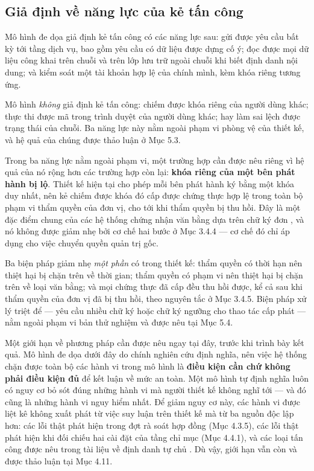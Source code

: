 \subsection{Giả định về năng lực của kẻ tấn công}

Mô hình đe dọa giả định kẻ tấn công có các năng lực sau: gửi được yêu cầu bất kỳ tới tầng dịch vụ, bao gồm yêu cầu có dữ liệu được dựng cố ý; đọc được mọi dữ liệu công khai trên chuỗi và trên lớp lưu trữ ngoài chuỗi khi biết định danh nội dung; và kiểm soát một tài khoản hợp lệ của chính mình, kèm khóa riêng tương ứng.

Mô hình \emph{không} giả định kẻ tấn công: chiếm được khóa riêng của người dùng khác; thực thi được mã trong trình duyệt của người dùng khác; hay làm sai lệch được trạng thái của chuỗi. Ba năng lực này nằm ngoài phạm vi phòng vệ của thiết kế, và hệ quả của chúng được thảo luận ở Mục 5.3.

Trong ba năng lực nằm ngoài phạm vi, một trường hợp cần được nêu riêng vì hệ quả của nó rộng hơn các trường hợp còn lại: \textbf{khóa riêng của một bên phát hành bị lộ}. Thiết kế hiện tại cho phép mỗi bên phát hành ký bằng một khóa duy nhất, nên kẻ chiếm được khóa đó cấp được chứng thực hợp lệ trong toàn bộ phạm vi thẩm quyền của đơn vị, cho tới khi thẩm quyền bị thu hồi. Đây là một đặc điểm chung của các hệ thống chứng nhận văn bằng dựa trên chữ ký đơn \cite{Saramago2021}, và nó không được giảm nhẹ bởi cơ chế hai bước ở Mục 3.4.4 --- cơ chế đó chỉ áp dụng cho việc chuyển quyền quản trị gốc.

Ba biện pháp giảm nhẹ \emph{một phần} có trong thiết kế: thẩm quyền có thời hạn nên thiệt hại bị chặn trên về thời gian; thẩm quyền có phạm vi nên thiệt hại bị chặn trên về loại văn bằng; và mọi chứng thực đã cấp đều thu hồi được, kể cả sau khi thẩm quyền của đơn vị đã bị thu hồi, theo nguyên tắc ở Mục 3.4.5. Biện pháp xử lý triệt để --- yêu cầu nhiều chữ ký hoặc chữ ký ngưỡng cho thao tác cấp phát --- nằm ngoài phạm vi bản thử nghiệm và được nêu tại Mục 5.4.

Một giới hạn về phương pháp cần được nêu ngay tại đây, trước khi trình bày kết quả. Mô hình đe dọa dưới đây do chính nghiên cứu định nghĩa, nên việc hệ thống chặn được toàn bộ các hành vi trong mô hình là \textbf{điều kiện cần chứ không phải điều kiện đủ} để kết luận về mức an toàn. Một mô hình tự định nghĩa luôn có nguy cơ bỏ sót đúng những hành vi mà người thiết kế không nghĩ tới --- và đó cũng là những hành vi nguy hiểm nhất. Để giảm nguy cơ này, các hành vi được liệt kê không xuất phát từ việc suy luận trên thiết kế mà từ ba nguồn độc lập hơn: các lỗi thật phát hiện trong đợt rà soát hợp đồng (Mục 4.3.5), các lỗi thật phát hiện khi đối chiếu hai cài đặt của tầng chỉ mục (Mục 4.4.1), và các loại tấn công được nêu trong tài liệu về định danh tự chủ \cite{Krul2024, Ambati2026}. Dù vậy, giới hạn vẫn còn và được thảo luận tại Mục 4.11.

